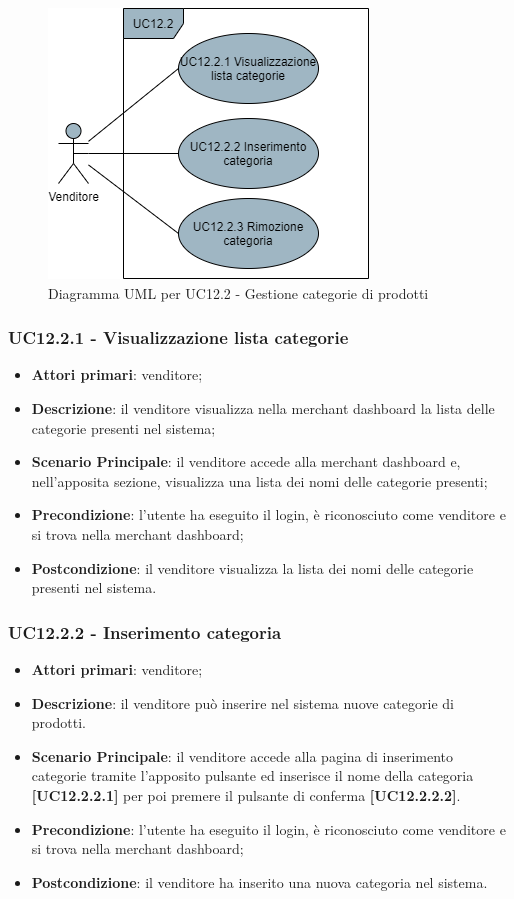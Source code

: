 \begin{figure}[H]
\centering
\includegraphics[scale=0.6]{res/UseCase/Immagini/GestioneCategorie}
\caption{Diagramma UML per UC12.2 - Gestione categorie di prodotti}
\end{figure}

\subsubsection{UC12.2.1 - Visualizzazione lista categorie}
\begin{itemize}
\item \textbf{Attori primari}: venditore;
\item \textbf{Descrizione}: il venditore visualizza nella merchant dashboard la lista delle categorie presenti nel sistema;
\item \textbf{Scenario Principale}: il venditore accede alla merchant dashboard e, nell'apposita sezione, visualizza una lista dei nomi delle categorie presenti;
\item \textbf{Precondizione}: l'utente ha eseguito il login, è riconosciuto come venditore e si trova nella merchant dashboard;
\item \textbf{Postcondizione}: il venditore visualizza la lista dei nomi delle categorie presenti nel sistema.
\end{itemize}

\subsubsection{UC12.2.2 - Inserimento categoria}
\begin{itemize}
\item \textbf{Attori primari}: venditore;
\item \textbf{Descrizione}: il venditore può inserire nel sistema nuove categorie di prodotti.
\item \textbf{Scenario Principale}: il venditore accede alla pagina di inserimento categorie tramite l'apposito pulsante ed inserisce il nome della categoria \textbf{[UC12.2.2.1]} per poi premere il pulsante di conferma \textbf{[UC12.2.2.2]}.
\item \textbf{Precondizione}: l'utente ha eseguito il login, è riconosciuto come venditore e si trova nella merchant dashboard;
\item \textbf{Postcondizione}: il venditore ha inserito una nuova categoria nel sistema.
\end{itemize}


